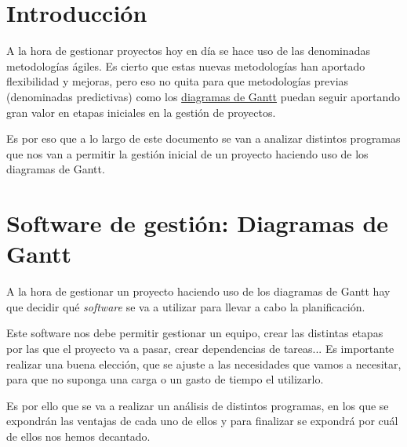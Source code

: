 \documentclass{\ClassPath/viu-tfm-template}
\begin{document}
    \graphicspath{{../VIU_TFM_LaTeX_template/}}

    \coverpage

    \tableofcontents

\chapter{Introducción}

A la hora de gestionar proyectos hoy en día se hace uso de las denominadas metodologías ágiles. Es cierto que estas nuevas metodologías han aportado flexibilidad y mejoras, pero eso no quita para que metodologías previas (denominadas predictivas) como los \href{https://es.wikipedia.org/wiki/Diagrama_de_Gantt}{diagramas de Gantt} puedan seguir aportando gran valor en etapas iniciales en la gestión de proyectos.

Es por eso que a lo largo de este documento se van a analizar distintos programas que nos van a permitir la gestión inicial de un proyecto haciendo uso de los diagramas de Gantt.


\chapter{Software de gestión: Diagramas de Gantt}
A la hora de gestionar un proyecto haciendo uso de los diagramas de Gantt hay que decidir qué \textit{software} se va a utilizar para llevar a cabo la planificación.

Este software nos debe permitir gestionar un equipo, crear las distintas etapas por las que el proyecto va a pasar, crear dependencias de tareas... Es importante realizar una buena elección, que se ajuste a las necesidades que vamos a necesitar, para que no suponga una carga o un gasto de tiempo el utilizarlo.

Es por ello que se va a realizar un análisis de distintos programas, en los que se expondrán las ventajas de cada uno de ellos y para finalizar se expondrá por cuál de ellos nos hemos decantado.
\end{document}
